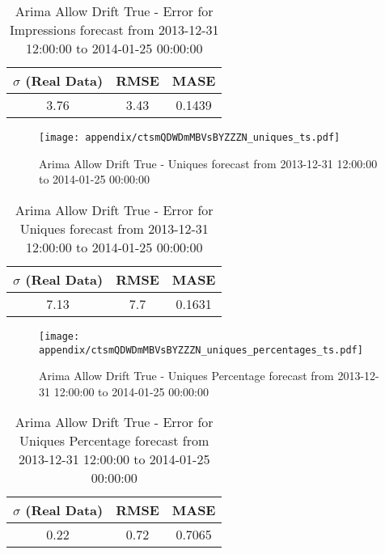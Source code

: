 \begin{table}[H]
\centering
\footnotesize
\begin{tabular}{ccc}
$\sigma$ (Real Data) & RMSE & MASE   \\ \hline
3.76 & 3.43 & 0.1439 \\
\end{tabular}

\vspace{0.5cm}

\caption{
Arima Allow Drift True - Error for Impressions forecast from 2013-12-31 12:00:00 to 2014-01-25 00:00:00}
\end{table}

\begin{figure}[H] \begin{center} \leavevmode
\texttt{[image: appendix/ctsmQDWDmMBVsBYZZZN\_uniques\_ts.pdf]} \caption{
Arima Allow Drift True - Uniques forecast from 2013-12-31 12:00:00 to 2014-01-25 00:00:00} \label{fig:appendix/ctsmQDWDmMBVsBYZZZN_uniques_ts.pdf} \end{center}
\end{figure}

\begin{table}[H]
\centering
\footnotesize
\begin{tabular}{ccc}
$\sigma$ (Real Data) & RMSE & MASE   \\ \hline
7.13 & 7.7 & 0.1631 \\
\end{tabular}

\vspace{0.5cm}

\caption{
Arima Allow Drift True - Error for Uniques forecast from 2013-12-31 12:00:00 to 2014-01-25 00:00:00}
\end{table}

\begin{figure}[H] \begin{center} \leavevmode
\texttt{[image: appendix/ctsmQDWDmMBVsBYZZZN\_uniques\_percentages\_ts.pdf]} \caption{
Arima Allow Drift True - Uniques Percentage forecast from 2013-12-31 12:00:00 to 2014-01-25 00:00:00} \label{fig:appendix/ctsmQDWDmMBVsBYZZZN_uniques_percentages_ts.pdf} \end{center}
\end{figure}

\begin{table}[H]
\centering
\footnotesize
\begin{tabular}{ccc}
$\sigma$ (Real Data) & RMSE & MASE   \\ \hline
0.22 & 0.72 & 0.7065 \\
\end{tabular}

\vspace{0.5cm}

\caption{
Arima Allow Drift True - Error for Uniques Percentage forecast from 2013-12-31 12:00:00 to 2014-01-25 00:00:00}
\end{table}

